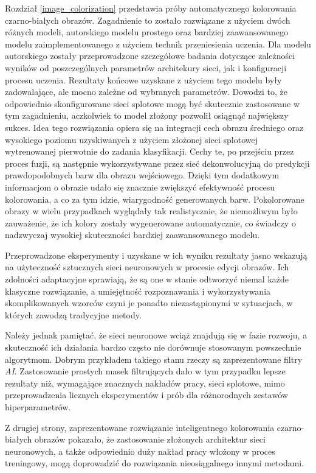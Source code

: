 \documentclass[10pt, a4paper, twoside, notitlepage, openright]{article}
\begin{document}
  Rozdział \ref{image_colorization} przedstawia próby automatycznego kolorowania
  czarno-białych obrazów.
  Zagadnienie to zostało rozwiązane z użyciem dwóch różnych modeli, autorskiego modelu
  prostego oraz bardziej zaawansowanego modelu zaimplementowanego z użyciem technik
  przeniesienia uczenia. Dla modelu autorskiego zostały przeprowadzone szczegółowe
  badania dotyczące zależności wyników od poszczególnych parametrów architekury
  sieci, jak i konfiguracji procesu uczenia. Rezultaty końcowe uzyskane z użyciem
  tego modelu były zadowalające, ale mocno zależne od wybranych parametrów.
  Dowodzi to, że odpowiednio skonfigurowane sieci splotowe mogą być skutecznie
  zastosowane w tym zagadnieniu, aczkolwiek to model złożony pozwolił osiągnąć
  największy sukces.
  Idea tego rozwiązania opiera się na integracji cech obrazu średniego oraz wysokiego
  poziomu uzyskiwanych z użyciem złożonej sieci splotowej wytrenowanej pierwotnie do
  zadania klasyfikacji. Cechy te, po przejściu przez proces fuzji, są następnie
  wykorzystywane przez sieć dekonwolucyjną do predykcji prawdopodobnych barw dla
  obrazu wejściowego. Dzięki tym dodatkowym informacjom o obrazie udało się
  znacznie zwiększyć efektywność procesu kolorowania, a co za tym idzie,
  wiarygodność generowanych barw. Pokolorowane obrazy w wielu przypadkach
  wyglądały tak realistycznie, że niemożliwym było zauważenie, że ich kolory zostały
  wygenerowane automatycznie, co
  świadczy o nadzwyczaj wysokiej skuteczności bardziej zaawansowanego modelu.

  Przeprowadzone eksperymenty i uzyskane w ich wyniku rezultaty jasno
  wskazują na użyteczność sztucznych sieci neuronowych w procesie edycji obrazów.
  Ich zdolności adaptacyjne sprawiają, że są one w stanie odtworzyć niemal każde
  klasyczne rozwiązanie, a umiejętność rozpoznawania i wykorzystywania
  skomplikowanych wzorców czyni je ponadto niezastąpionymi w sytuacjach, w których
  zawodzą tradycyjne metody.

  Należy jednak pamiętać, że sieci neuronowe wciąż znajdują się w fazie rozwoju,
  a skuteczność ich działania bardzo często nie dorównuje stosowanym powszechnie
  algorytmom. Dobrym przykładem takiego stanu rzeczy są zaprezentowane filtry \textit{AI}.
  Zastosowanie prostych masek filtrujących dało w tym przypadku lepsze rezultaty niż,
  wymagające znacznych nakładów pracy, sieci splotowe, mimo przeprowadzenia licznych
  eksperymentów i prób dla różnorodnych zestawów hiperparametrów.

  Z drugiej strony, zaprezentowane rozwiązanie inteligentnego kolorowania
  czarno-białych obrazów pokazało, że zastosowanie złożonych architektur sieci
  neuronowych, a także odpowiednio duży nakład pracy włożony w proces treningowy,
  mogą doprowadzić do rozwiązania nieosiągalnego innymi metodami.
\end{document}
